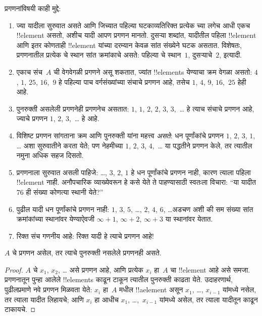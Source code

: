 \documentclass[../../../include/open-logic-section]{subfiles}
\begin{document}
\begin{explain}
प्रगणनांविषयी काही मुद्दे:
\begin{enumerate}
\item ज्या यादीला सुरुवात असते आणि जिच्यात पहिल्या घटकाव्यतिरिक्त
  प्रत्येक च्या लगेच आधी एकच !!{element} असतो, अशीच यादी
  आपण प्रगणन मानतो. दुसऱ्या शब्दांत, यादीतील पहिला !!{element}
  आणि इतर कोणताही !!{element} यांच्या दरम्यान केवळ सांत संख्येने घटक
  असतात. विशेषतः, प्रगणनातील प्रत्येक चे स्थान सांत
  क्रमांकाचे असते: पहिल्या चे स्थान~$1$, दुसऱ्याचे~$2$, इत्यादी.
\item एकाच संच~$A$ ची वेगवेगळी प्रगणने असू शकतात, ज्यांत
  !!{element}s येण्याचा क्रम वेगळा असतो: $4$, $1$, $25$, $16$,~$9$
  हे पहिल्या पाच वर्गसंख्यांच्या संचाचे प्रगणन आहे, तसेच
  $1$, $4$, $9$, $16$,~$25$ हेही आहे.
\item पुनरुक्ती असलेली प्रगणनेही प्रगणनेच असतात: $1$, $1$, $2$,
  $2$, $3$, $3$,~\dots{} हे त्याच संचाचे प्रगणन आहे, ज्याचे
  प्रगणन $1$, $2$, $3$,~\dots{} हे आहे.
\item विशिष्ट प्रगणन सांगताना क्रम आणि पुनरुक्ती यांना महत्त्व
  \emph{असते}: धन पूर्णांकांचे प्रगणन $1$, $2$, $3$, $1$, \dots{}
  अशा सुरुवातीने करता येते; पण नेहमीच्या $1$, $2$, $3$, $4$,~\dots
  या पद्धतीने प्रगणन केले, तर त्यातील नमुना अधिक सहज दिसतो.
\item प्रगणनाला सुरुवात असली पाहिजे: \dots, $3$, $2$, $1$ हे
  धन पूर्णांकांचे प्रगणन नाही, कारण त्याला पहिला !!{element} नाही.
  अनौपचारिक व्याख्येवरून हे कसे येते ते पाहण्यासाठी स्वतःला विचारा:
  ``या यादीत 76 ही संख्या कोणत्या स्थानी येते?''
\item पुढील यादी धन पूर्णांकांचे प्रगणन नाही:
  $1$, $3$, $5$, \dots, $2$, $4$, $6$, \dots\@ अडचण अशी की
  सम संख्या सांत क्रमांकांच्या स्थानांवर येण्याऐवजी
  $\infty + 1$, $\infty + 2$, $\infty + 3$ या स्थानांवर येतात.
\item रिक्त संच गणनीय आहे: रिक्त यादी हे त्याचे प्रगणन आहे!{}
\end{enumerate}
\end{explain}

\begin{prop}
  $A$ चे प्रगणन असेल, तर त्याचे पुनरुक्ती नसलेले प्रगणनही असते.
\end{prop}

\begin{proof}
  $A$ चे $x_1$, $x_2$, \dots{} असे प्रगणन आहे, आणि प्रत्येक
  $x_i$ हा~$A$ चा !!{element} आहे असे समजा. प्रगणनातून पुन्हा
  आलेले !!{element}s काढून टाकून त्यातील पुनरुक्ती काढता येते.
  उदाहरणार्थ, पुढीलप्रमाणे नवे प्रगणन मिळवता येते: $x_i$ हा~$A$
  मधील !!a{element} असून $x_1$, \dots, $x_{i-1}$ यांमध्ये नसेल,
  तर त्याला यादीत लिहायचे; आणि $x_i$ हा आधीच $x_1$, \dots,~$x_{i-1}$
  यांमध्ये असेल, तर त्याला यादीतून काढून टाकायचे.
\end{proof}
\end{document}
